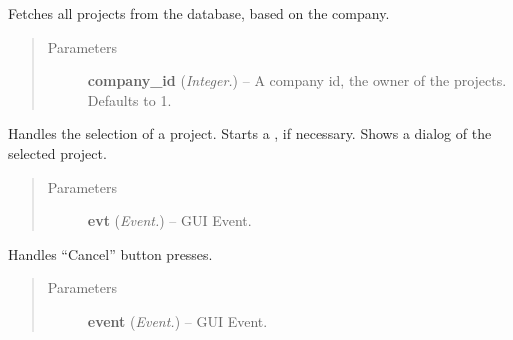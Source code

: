 \documentclass[letterpaper,10pt,english]{sphinxmanual}
\begin{document}
\begin{fulllineitems}
\begin{fulllineitems}
\begin{quote}
\begin{description}
\end{description}\end{quote}

\end{fulllineitems}


\begin{fulllineitems}
\label{api:wos.ProjectSelectDialog.GetProjects}
Fetches all projects from the database, based on the company.
\begin{quote}\begin{description}
\item[{Parameters}] \leavevmode
\textbf{company\_id} (\emph{Integer.}) -- A company id, the owner of the projects. Defaults to 1.

\end{description}\end{quote}

\end{fulllineitems}


\begin{fulllineitems}
\label{api:wos.ProjectSelectDialog.SelEvent}
Handles the selection of a project.
Starts a {\hyperref[api:wos.CURRENT_PROJECT]{}}, if necessary.
Shows a dialog of the selected project.
\begin{quote}\begin{description}
\item[{Parameters}] \leavevmode
\textbf{evt} (\emph{Event.}) -- GUI Event.

\end{description}\end{quote}

\end{fulllineitems}


\begin{fulllineitems}
\label{api:wos.ProjectSelectDialog.onCancel}
Handles ``Cancel'' button presses.
\begin{quote}\begin{description}
\item[{Parameters}] \leavevmode
\textbf{event} (\emph{Event.}) -- GUI Event.

\end{description}\end{quote}

\end{fulllineitems}


\end{fulllineitems}
\end{document}
